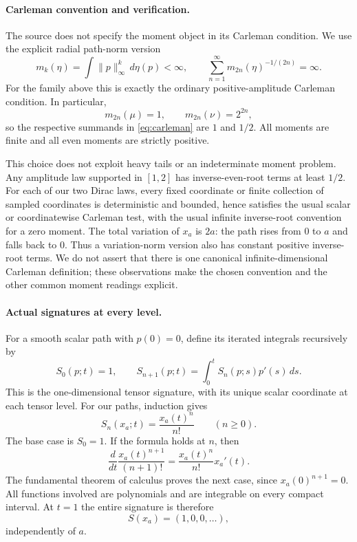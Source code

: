 \documentclass[11pt]{article}
\begin{document}
\paragraph{Carleman convention and verification.}
The source does not specify the moment object in its Carleman
condition. We use the explicit radial path-norm version
\begin{equation}\label{eq:carleman}
 m_k(\eta)=\int\|p\|_\infty^k\,d\eta(p)<\infty,
 \qquad
 \sum_{n=1}^{\infty}m_{2n}(\eta)^{-1/(2n)}=\infty.
\end{equation}
For the family above this is exactly the ordinary positive-amplitude
Carleman condition. In particular,
\[
 m_{2n}(\mu)=1,\qquad m_{2n}(\nu)=2^{2n},
\]
so the respective summands in \eqref{eq:carleman} are $1$ and $1/2$.
All moments are finite and all even moments are strictly positive.

This choice does not exploit heavy tails or an indeterminate moment
problem. Any amplitude law supported in $[1,2]$ has inverse-even-root
terms at least $1/2$. For each of our two Dirac laws, every fixed
coordinate or finite collection of sampled coordinates is
deterministic and bounded, hence satisfies the usual scalar or
coordinatewise Carleman test, with the usual infinite inverse-root
convention for a zero moment. The total variation of $x_a$ is $2a$:
the path rises from $0$ to $a$ and falls back to $0$.
Thus a variation-norm version also has constant positive inverse-root
terms. We do not assert that there is one canonical infinite-dimensional
Carleman definition; these observations make the chosen convention
and the other common moment readings explicit.

\paragraph{Actual signatures at every level.}
For a smooth scalar path with $p(0)=0$, define its iterated integrals
recursively by
\[
 S_0(p;t)=1,\qquad
 S_{n+1}(p;t)=\int_0^t S_n(p;s)p'(s)\,ds.
\]
This is the one-dimensional tensor signature, with its unique scalar
coordinate at each tensor level. For our paths, induction gives
\begin{equation}\label{eq:signature}
 S_n(x_a;t)=\frac{x_a(t)^n}{n!}\qquad(n\ge0).
\end{equation}
The base case is $S_0=1$. If the formula holds at $n$, then
\[
 \frac{d}{dt}\frac{x_a(t)^{n+1}}{(n+1)!}
 =\frac{x_a(t)^n}{n!}x_a'(t).
\]
The fundamental theorem of calculus proves the next case, since
$x_a(0)^{n+1}=0$. All functions involved are polynomials and are
integrable on every compact interval. At $t=1$ the entire signature is
therefore
\[
 S(x_a)=(1,0,0,\ldots),
\]
independently of $a$.
\end{document}
